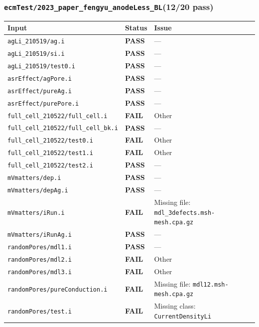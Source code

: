 \documentclass[10pt,letterpaper]{article}
\newcommand{\PASS}{\textcolor{passgreen}{\textbf{PASS}}}
\newcommand{\FAIL}{\textcolor{failred}{\textbf{FAIL}}}
\newcommand{\code}[1]{\texttt{\small #1}}
\begin{document}
\subsubsection{\code{ecmTest/2023\_paper\_fengyu\_anodeLess\_BL}\hfill (12/20 pass)}
\begin{longtable}{p{} l p{}}
\toprule
Input & Status & Issue \\
\midrule
\endhead
\code{agLi\_210519/ag.i} & \PASS & --- \\
\code{agLi\_210519/si.i} & \PASS & --- \\
\code{agLi\_210519/test0.i} & \PASS & --- \\
\code{asrEffect/agPore.i} & \PASS & --- \\
\code{asrEffect/pureAg.i} & \PASS & --- \\
\code{asrEffect/purePore.i} & \PASS & --- \\
\code{full\_cell\_210522/full\_cell.i} & \FAIL & Other \\
\code{full\_cell\_210522/full\_cell\_bk.i} & \PASS & --- \\
\code{full\_cell\_210522/test0.i} & \FAIL & Other \\
\code{full\_cell\_210522/test1.i} & \FAIL & Other \\
\code{full\_cell\_210522/test2.i} & \PASS & --- \\
\code{mVmatters/dep.i} & \PASS & --- \\
\code{mVmatters/depAg.i} & \PASS & --- \\
\code{mVmatters/iRun.i} & \FAIL & Missing file: \code{mdl\_3defects.msh-mesh.cpa.gz} \\
\code{mVmatters/iRunAg.i} & \PASS & --- \\
\code{randomPores/mdl1.i} & \PASS & --- \\
\code{randomPores/mdl2.i} & \FAIL & Other \\
\code{randomPores/mdl3.i} & \FAIL & Other \\
\code{randomPores/pureConduction.i} & \FAIL & Missing file: \code{mdl12.msh-mesh.cpa.gz} \\
\code{randomPores/test.i} & \FAIL & Missing class: \code{CurrentDensityLi} \\
\bottomrule
\end{longtable}
\end{document}
